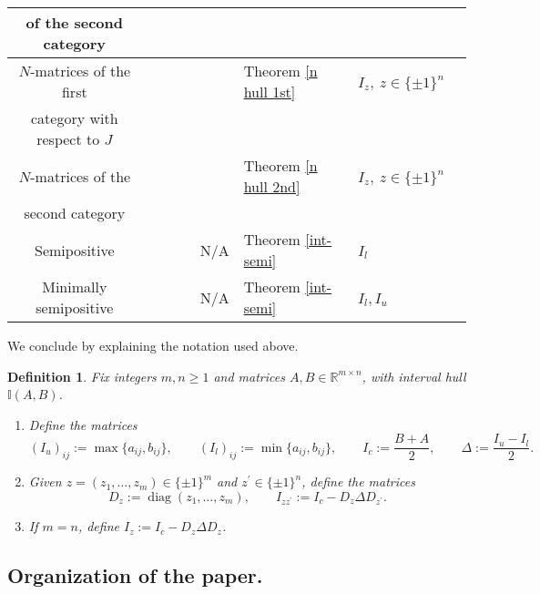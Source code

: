 \documentclass[11pt]{article}
\newtheorem{defn}{Definition}[section]
\DeclareMathOperator{\diag }{diag}
\begin{document}
\begin{center}
\begin{tabular}{|c|c|l|l|c|}
		of the second category & && \\
		
		\hline $N$-matrices of the first&  ~\cite[Theorem 4.3]{moh-sri-nmat-lcp} & Theorem \ref{n hull 1st}&~$I_{z}, \ z \in \{ \pm 1 \}^n$\\
		
		category with respect to $J$ & && \\
		
		\hline $N$-matrices of the&  ~~\cite[Theorem 2]{par-rav-nmat} & Theorem \ref{n hull 2nd}&~$I_{z}, \ z \in \{ \pm 1 \}^n$\\
		
		second category & && \\
		
		\hline Semipositive & ~~~~~~~N/A  & Theorem \ref{int-semi}&~$I_{l}$\\
		
		\hline Minimally semipositive  & ~~~~~~~N/A & Theorem \ref{int-semi}&~$I_{l}, I_{u}$\\
		
		\hline
		
	\end{tabular}
	\label{table1}
\end{center}

We conclude by explaining the notation used above.

\begin{defn}
Fix integers $m,n \geq 1$ and matrices $A, B \in \mathbb{R}^{m \times n}$, with interval hull $\mathbb{I}(A,B)$.
\begin{enumerate}
	\item Define the matrices
	\[
	(I_u)_{ij}:= \max\{a_{ij},b_{ij}\}, \qquad
	(I_l)_{ij}:= \min\{a_{ij},b_{ij}\}, \qquad
	I_c := \frac{B + A}{2}, \qquad
	\Delta := \frac{I_u - I_l}{2}.
	\]
	\item Given $z=(z_1,\dots,z_m) \in \{ \pm 1 \}^m$ and $z^{\prime} \in \{ \pm 1 \}^n$, define the matrices
	\[
	D_z :=\diag(z_1,\dots,z_m), \qquad
	I_{zz^{\prime}} := I_c - D_z\Delta D_{z^{\prime}}.
	\]
	\item If $m=n$, define $I_z := I_c - D_z \Delta D_z$.
\end{enumerate}
\end{defn}


\subsection*{Organization of the paper.}
\end{document}
